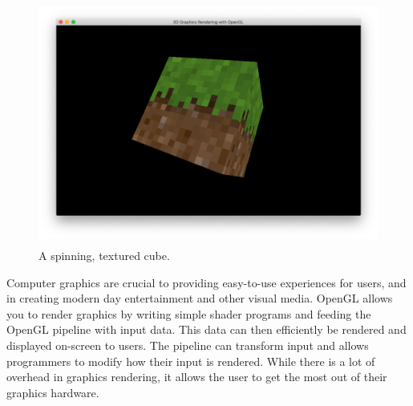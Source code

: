 \documentclass{article}
\begin{document}
\begin{figure}[h]
    \centering
    \includegraphics[height=8cm]{textured-cube.png}
	\caption{A spinning, textured cube.}
	\label{fig:final-product}
\end{figure}

Computer graphics are crucial to providing easy-to-use experiences for users, and in creating modern day entertainment and other visual media. OpenGL allows you to render graphics by writing simple shader programs and feeding the OpenGL pipeline with input data. This data can then efficiently be rendered and displayed on-screen to users. The pipeline can transform input and allows programmers to modify how their input is rendered. While there is a lot of overhead in graphics rendering, it allows the user to get the most out of their graphics hardware.

\clearpage

{}

\end{document}
